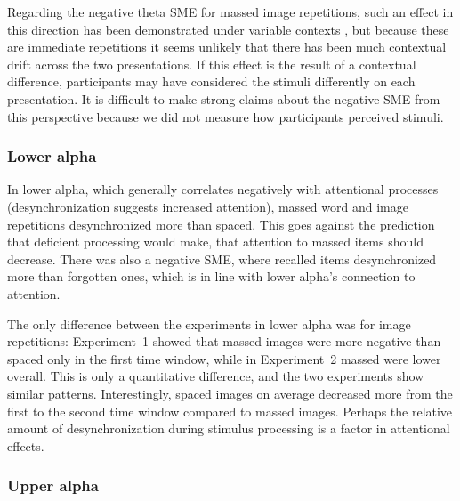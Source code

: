

Regarding the negative theta SME for massed image repetitions, such an effect in this direction has been demonstrated under variable contexts \cite{StauHans2013}, but because these are immediate repetitions it seems unlikely that there has been much contextual drift across the two presentations.  If this effect is the result of a contextual difference, participants may have considered the stimuli differently on each presentation.  It is difficult to make strong claims about the negative SME from this perspective because we did not measure how participants perceived stimuli.

\subsubsection{Lower alpha}

In lower alpha, which generally correlates negatively with attentional processes (desynchronization suggests increased attention), massed word and image repetitions desynchronized more than spaced.  This goes against the prediction that deficient processing would make, that attention to massed items should decrease.  There was also a negative SME, where recalled items desynchronized more than forgotten ones, which is in line with lower alpha's connection to attention.

The only difference between the experiments in lower alpha was for image repetitions: Experiment~1 showed that massed images were more negative than spaced only in the first time window, while in Experiment~2 massed were lower overall.  This is only a quantitative difference, and the two experiments show similar patterns.  Interestingly, spaced images on average decreased more from the first to the second time window compared to massed images.  Perhaps the relative amount of desynchronization during stimulus processing is a factor in attentional effects.

\subsubsection{Upper alpha}

